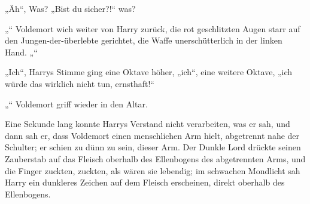 „Äh“, Was? „Bist du sicher?!“ was?

„“
Voldemort wich weiter von Harry zurück, die rot geschlitzten Augen starr auf den Jungen-der-überlebte gerichtet, die Waffe unerschütterlich in der linken Hand.
„“

„Ich“, Harrys Stimme ging eine Oktave höher,
„ich“, eine weitere Oktave, „ich würde das wirklich nicht tun, ernsthaft!“

„“
Voldemort griff wieder in den Altar.

Eine Sekunde lang konnte Harrys Verstand nicht verarbeiten, was er sah, und dann sah er, dass Voldemort einen menschlichen Arm hielt, abgetrennt nahe der Schulter; er schien zu dünn zu sein, dieser Arm.
Der Dunkle Lord drückte seinen Zauberstab auf das Fleisch oberhalb des Ellenbogens des abgetrennten Arms, und die Finger zuckten, zuckten, als wären sie lebendig; im schwachen Mondlicht sah Harry ein dunkleres Zeichen auf dem Fleisch erscheinen, direkt oberhalb des Ellenbogens.


